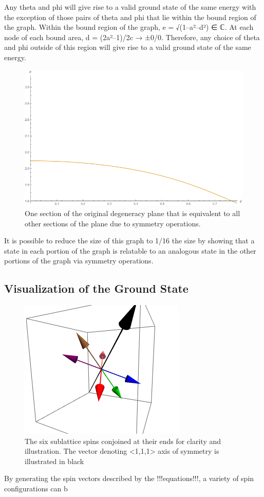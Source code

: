 Any theta and phi will give rise to a valid ground state of the same energy with the exception of those pairs of theta and phi that lie within the bound region of the graph. Within the bound region of the graph, e = √(1–a²–d²) ∈ ℂ. At each node of each bound area, d = (2a²–1)/2c → ±0/0. Therefore, any choice of theta and phi outside of this region will give rise to a valid ground state of the same energy.

\begin{figure}
	\includegraphics[width=\linewidth]{img/degeneracyplane.png}
	\caption{One section of the original degeneracy plane that is equivalent to all other sections of the plane due to symmetry operations.}
	\label{fig:degenplane}
\end{figure}

It is possible to reduce the size of this graph to 1/16 the size by showing that a state in each portion of the graph is relatable to an analogous state in the other portions of the graph via symmetry operations.
\clearpage

\subsection{Visualization of the Ground State}
\begin{center}
\begin{figure}[ht]
	\includegraphics[scale=1.2]{img/samplegs.png}
	\caption{The six sublattice spins conjoined at their ends for clarity and illustration. The vector denoting <1,1,1> axis of symmetry is illustrated in black}
	\label{fig:sampgs}
\end{figure}
\end{center}

By generating the spin vectors described by the !!!equations!!!, a variety of spin configurations can b
\clearpage